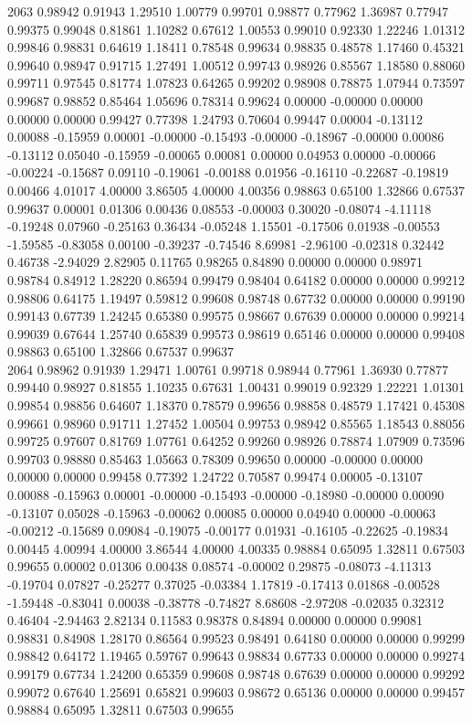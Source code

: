 {2063 0.98942 0.91943 1.29510 1.00779 0.99701 0.98877 0.77962 1.36987 0.77947 0.99375 0.99048 0.81861 1.10282 0.67612 1.00553 0.99010 0.92330 1.22246 1.01312 0.99846 0.98831 0.64619 1.18411 0.78548 0.99634 0.98835 0.48578 1.17460 0.45321 0.99640 0.98947 0.91715 1.27491 1.00512 0.99743 0.98926 0.85567 1.18580 0.88060 0.99711 0.97545 0.81774 1.07823 0.64265 0.99202 0.98908 0.78875 1.07944 0.73597 0.99687 0.98852 0.85464 1.05696 0.78314 0.99624 0.00000 -0.00000 0.00000 0.00000 0.00000 0.99427 0.77398 1.24793 0.70604 0.99447 0.00004 -0.13112 0.00088 -0.15959 0.00001 -0.00000 -0.15493 -0.00000 -0.18967 -0.00000 0.00086 -0.13112 0.05040 -0.15959 -0.00065 0.00081 0.00000 0.04953 0.00000 -0.00066 -0.00224 -0.15687 0.09110 -0.19061 -0.00188 0.01956 -0.16110 -0.22687 -0.19819 0.00466 4.01017 4.00000 3.86505 4.00000 4.00356 0.98863 0.65100 1.32866 0.67537 0.99637 0.00001 0.01306 0.00436 0.08553 -0.00003 0.30020 -0.08074 -4.11118 -0.19248 0.07960 -0.25163 0.36434 -0.05248 1.15501 -0.17506 0.01938 -0.00553 -1.59585 -0.83058 0.00100 -0.39237 -0.74546 8.69981 -2.96100 -0.02318 0.32442 0.46738 -2.94029 2.82905 0.11765 0.98265 0.84890 0.00000 0.00000 0.98971 0.98784 0.84912 1.28220 0.86594 0.99479 0.98404 0.64182 0.00000 0.00000 0.99212 0.98806 0.64175 1.19497 0.59812 0.99608 0.98748 0.67732 0.00000 0.00000 0.99190 0.99143 0.67739 1.24245 0.65380 0.99575 0.98667 0.67639 0.00000 0.00000 0.99214 0.99039 0.67644 1.25740 0.65839 0.99573 0.98619 0.65146 0.00000 0.00000 0.99408 0.98863 0.65100 1.32866 0.67537 0.99637 \\
2064 0.98962 0.91939 1.29471 1.00761 0.99718 0.98944 0.77961 1.36930 0.77877 0.99440 0.98927 0.81855 1.10235 0.67631 1.00431 0.99019 0.92329 1.22221 1.01301 0.99854 0.98856 0.64607 1.18370 0.78579 0.99656 0.98858 0.48579 1.17421 0.45308 0.99661 0.98960 0.91711 1.27452 1.00504 0.99753 0.98942 0.85565 1.18543 0.88056 0.99725 0.97607 0.81769 1.07761 0.64252 0.99260 0.98926 0.78874 1.07909 0.73596 0.99703 0.98880 0.85463 1.05663 0.78309 0.99650 0.00000 -0.00000 0.00000 0.00000 0.00000 0.99458 0.77392 1.24722 0.70587 0.99474 0.00005 -0.13107 0.00088 -0.15963 0.00001 -0.00000 -0.15493 -0.00000 -0.18980 -0.00000 0.00090 -0.13107 0.05028 -0.15963 -0.00062 0.00085 0.00000 0.04940 0.00000 -0.00063 -0.00212 -0.15689 0.09084 -0.19075 -0.00177 0.01931 -0.16105 -0.22625 -0.19834 0.00445 4.00994 4.00000 3.86544 4.00000 4.00335 0.98884 0.65095 1.32811 0.67503 0.99655 0.00002 0.01306 0.00438 0.08574 -0.00002 0.29875 -0.08073 -4.11313 -0.19704 0.07827 -0.25277 0.37025 -0.03384 1.17819 -0.17413 0.01868 -0.00528 -1.59448 -0.83041 0.00038 -0.38778 -0.74827 8.68608 -2.97208 -0.02035 0.32312 0.46404 -2.94463 2.82134 0.11583 0.98378 0.84894 0.00000 0.00000 0.99081 0.98831 0.84908 1.28170 0.86564 0.99523 0.98491 0.64180 0.00000 0.00000 0.99299 0.98842 0.64172 1.19465 0.59767 0.99643 0.98834 0.67733 0.00000 0.00000 0.99274 0.99179 0.67734 1.24200 0.65359 0.99608 0.98748 0.67639 0.00000 0.00000 0.99292 0.99072 0.67640 1.25691 0.65821 0.99603 0.98672 0.65136 0.00000 0.00000 0.99457 0.98884 0.65095 1.32811 0.67503 0.99655 \\
}

